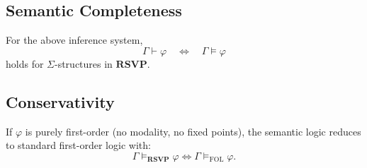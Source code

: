 \subsection{Semantic Completeness}

For the above inference system,
\[
\Gamma \vdash \varphi
\quad\Longleftrightarrow\quad
\Gamma \models \varphi
\]
holds for $\Sigma$-structures in $\mathbf{RSVP}$.

\subsection{Conservativity}

If $\varphi$ is purely first-order (no modality, no fixed points),  
the semantic logic reduces to standard first-order logic with:
\[
\Gamma\models_{\mathbf{RSVP}}\varphi
\iff
\Gamma\models_{\mathrm{FOL}}\varphi.
\]

